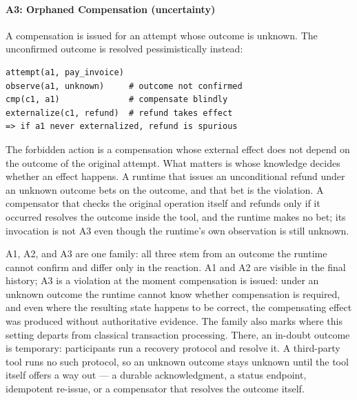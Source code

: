 \documentclass[runningheads]{comsis3}
\begin{document}
\paragraph{A3: Orphaned Compensation (uncertainty)}
A compensation is issued for an attempt whose outcome is unknown.
The unconfirmed outcome is resolved pessimistically instead:
\par\medskip\noindent\begin{minipage}{\linewidth}
\begingroup\small\begin{verbatim}
attempt(a1, pay_invoice)
observe(a1, unknown)     # outcome not confirmed
cmp(c1, a1)              # compensate blindly
externalize(c1, refund)  # refund takes effect
=> if a1 never externalized, refund is spurious
\end{verbatim}\endgroup
\end{minipage}\par\medskip\noindent
The forbidden action is a compensation whose external effect does not
depend on the outcome of the original attempt. What matters is whose
knowledge decides whether an effect happens. A runtime that issues an
unconditional refund under an unknown outcome bets on the outcome, and that
bet is the violation. A compensator that checks the original operation
itself and refunds only if it occurred resolves the outcome inside the
tool, and the runtime makes no bet; its invocation is not A3 even though
the runtime's own observation is still unknown.

A1, A2, and A3 are one family: all three stem from an outcome the runtime
cannot confirm and differ only in the reaction. A1 and A2 are visible in
the final history; A3 is a violation at the moment compensation is issued:
under an unknown outcome the runtime cannot know whether compensation is
required, and even where the resulting state happens to be correct, the compensating
effect was produced without authoritative evidence. The family also marks
where this setting departs from classical transaction processing. There, an
in-doubt outcome is temporary: participants run a recovery protocol and
resolve it. A third-party tool runs no such protocol, so an unknown outcome
stays unknown until the tool itself offers a way out --- a durable
acknowledgment, a status endpoint, idempotent re-issue, or a compensator
that resolves the outcome itself.
\end{document}
